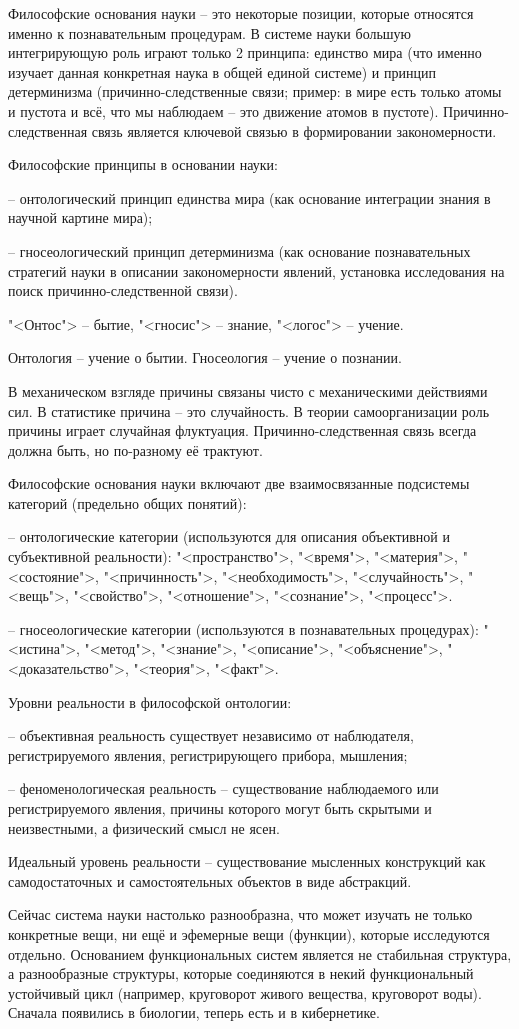 \documentclass[exam_answers.tex]{subfiles}
\begin{document}
\renewcommand{\baselinestretch}{\blch}

Философские основания науки – это некоторые позиции, которые относятся именно к познавательным процедурам. В системе науки большую интегрирующую роль играют только 2 принципа: единство мира (что именно изучает данная конкретная наука в общей единой системе) и принцип детерминизма (причинно-следственные связи; пример: в мире есть только атомы и пустота и всё, что мы наблюдаем – это движение атомов в пустоте). Причинно-следственная связь является ключевой связью в формировании закономерности.

Философские принципы в основании науки:

-- онтологический принцип единства мира (как основание интеграции знания в научной картине мира);

-- гносеологический принцип детерминизма (как основание познавательных стратегий науки в описании закономерности явлений, установка исследования на поиск причинно-следственной связи).

"<Онтос"> -- бытие, "<гносис"> -- знание, "<логос"> -- учение.

Онтология – учение о бытии. Гносеология – учение о познании.

В механическом взгляде причины связаны чисто с механическими действиями сил. В статистике причина – это случайность. В теории самоорганизации роль причины играет случайная флуктуация. Причинно-следственная связь всегда должна быть, но по-разному её трактуют.

Философские основания науки включают две взаимосвязанные подсистемы категорий (предельно общих понятий):

-- онтологические категории (используются для описания объективной и субъективной реальности): "<пространство">, "<время">, "<материя">, "<состояние">, "<причинность">, "<необходимость">, "<случайность">, "<вещь">, "<свойство">, "<отношение">, "<сознание">, "<процесс">.

-- гносеологические категории (используются в познавательных процедурах): "<истина">, "<метод">, "<знание">, "<описание">, "<объяснение">, "<доказательство">, "<теория">, "<факт">.

Уровни реальности в философской онтологии:

-- объективная реальность существует независимо от наблюдателя, регистрируемого явления, регистрирующего прибора, мышления;

-- феноменологическая реальность – существование наблюдаемого или регистрируемого явления, причины которого могут быть скрытыми и неизвестными, а физический смысл не ясен.

Идеальный уровень реальности – существование мысленных конструкций как самодостаточных и самостоятельных объектов в виде абстракций.

Сейчас система науки настолько разнообразна, что может изучать не только конкретные вещи, ни ещё и эфемерные вещи (функции), которые исследуются отдельно.
Основанием функциональных систем является не стабильная структура, а разнообразные структуры, которые соединяются в некий функциональный устойчивый цикл (например, круговорот живого вещества, круговорот воды).
Сначала появились в биологии, теперь есть и в кибернетике.
\end{document}
